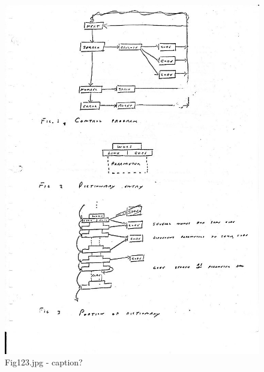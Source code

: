 \documentclass[b5paper, oneside]{book}
\begin{document}
\begin{figure}[ht!]
\centering
\includegraphics[width=140mm]{Fig123.jpg}
\caption{Fig123.jpg - caption?\label{exampleLabel1}}
\end{figure}
\end{document}
